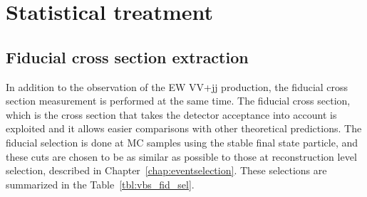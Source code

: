 \chapter{Statistical treatment}
\label{chap:statistics}

\section{Fiducial cross section extraction}
\label{sec:crosssection}
In addition to the observation of the EW VV+jj production, the fiducial cross section measurement is performed at the same time.
The fiducial cross section, which is the cross section that takes the detector acceptance into account is exploited and it allows easier comparisons with other theoretical predictions.
The fiducial selection is done at MC samples using the stable final state particle, and these cuts are chosen to be as similar as possible to those at reconstruction level selection, described in Chapter~\ref{chap:eventselection}.
These selections are summarized in the Table~\ref{tbl:vbs_fid_sel}. 

